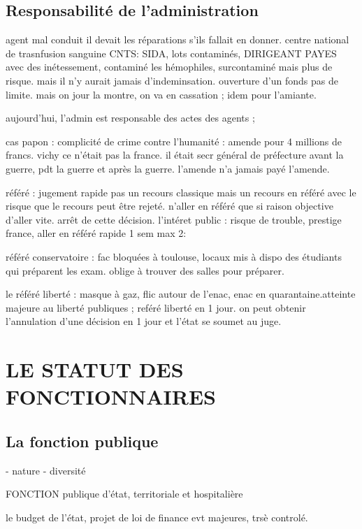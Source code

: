 \documentclass[a4paper,12pt]{article}
\begin{document}
\subsection{Responsabilité de l'administration}

agent mal conduit il devait les réparations s'ils fallait en donner.
centre national de trasnfusion sanguine CNTS: SIDA, lots contaminés, DIRIGEANT PAYES avec des inétessement, contaminé les hémophiles, surcontaminé mais plus de risque. mais il n'y aurait jamais d'indeminsation. ouverture d'un fonds pas de limite. mais on jour la montre, on va en cassation ; idem pour l'amiante.

aujourd'hui, l'admin est responsable des actes des agents ;  

cas papon : complicité de crime contre l'humanité : amende pour 4 millions de francs.
vichy ce n'était pas la france.
il était secr général de préfecture avant la guerre, pdt la guerre et après la guerre.
l'amende n'a jamais payé l'amende.



référé : jugement rapide pas un recours classique mais un recours en référé avec le risque que le recours peut être rejeté. n'aller en référé que si raison objective d'aller vite. arrêt de cette décision.
l'intéret public : risque de trouble, prestige france, aller en référé rapide 1 sem max 2:

référé  conservatoire : fac bloquées à toulouse, locaux mis à dispo des étudiants qui préparent les exam.
oblige à trouver des salles pour préparer.

le référé liberté : masque à gaz, flic autour de l'enac, enac en quarantaine.atteinte majeure au liberté publiques ; 
reféré liberté en 1 jour. on peut obtenir l'annulation d'une décision en 1 jour et l'état se soumet au juge.


\section{LE STATUT DES FONCTIONNAIRES}
\subsection{La fonction publique}

- nature
- diversité


FONCTION publique d'état, territoriale et hospitalière

le budget de l'état, projet de loi de finance evt majeures, trsè controlé.
\end{document}
